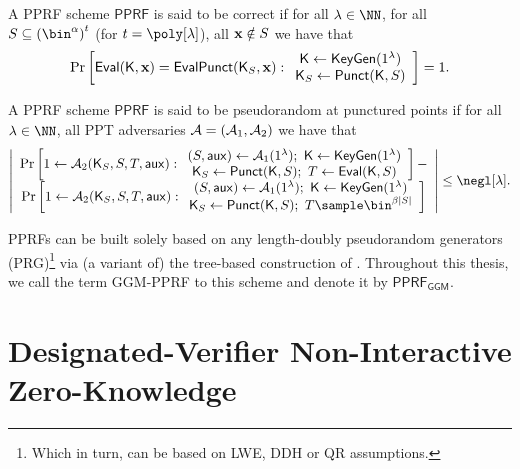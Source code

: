 \begin{definition}[Correctness]
A PPRF scheme $\mathsf{PPRF}$ is said to be correct if for all $\lambda\in\NN$, for all $S\subseteq\left(\bin^\alpha\right)^t$ (for $t=\poly[\lambda]$), all $\mathbf{x}\notin S$  we have that $$\Pr\left[\mathsf{Eval}(\mathsf{K},\mathbf{x})=\mathsf{EvalPunct}(\mathsf{K}_S,\mathbf{x}):\begin{array}{c}
     \mathsf{K}\leftarrow\mathsf{KeyGen}(1^\lambda) \\
     \mathsf{K}_S\leftarrow\mathsf{Punct}(\mathsf{K},S)
\end{array}\right]= 1.$$
\end{definition}


\begin{definition}[Pseudorandomness]
A PPRF scheme $\mathsf{PPRF}$ is said to be pseudorandom at punctured points if for all $\lambda\in\NN$, all PPT adversaries $\mathcal{A}=(\mathcal{A}_1,\mathcal{A}_2)$ we have that $$\left|\begin{array}{c}
     \Pr\left[1\leftarrow\Ac_2(\key_S,S,T,\mathsf{aux}):\begin{array}{c}
     (S,\mathsf{aux})\leftarrow\Ac_1(1^\lambda)  ; \,\,
     \key\leftarrow\mathsf{KeyGen}(1^\lambda) \\ 
      \key_S\leftarrow\mathsf{Punct}(\key,S); \,\,
      T\leftarrow\mathsf{Eval}(\key,S)
\end{array}\right]- \\
     \Pr\left[1\leftarrow\Ac_2(\key_S,S,T,\mathsf{aux}):\begin{array}{c}
     (S,\mathsf{aux})\leftarrow\Ac_1(1^\lambda)  ; \,\,
     \key\leftarrow\mathsf{KeyGen}(1^\lambda) \\ 
      \key_S\leftarrow\mathsf{Punct}(\key,S) ;\,\,
      T\sample \bin^{\beta |S|}
\end{array}\right]
\end{array}\right|\leq \negl[\lambda].$$
\end{definition}


PPRFs can be built solely based on any length-doubly pseudorandom generators (PRG)\footnote{Which in turn, can be based on LWE, DDH or QR assumptions.} via (a variant of) the tree-based construction of \cite{JACM:GolGolMic86}. Throughout this thesis, we call the term GGM-PPRF to this scheme and denote it by $\mathsf{PPRF}_\mathsf{GGM}$.

\section{Designated-Verifier Non-Interactive Zero-Knowledge}
\label{subsec:dvnizk}

